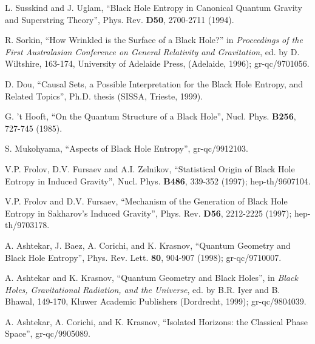 \documentclass[12pt]{article}
\newcommand{\comment}[1]{}
\newcommand{\keywords}[1]{}
\begin{document}
\begin{thebibliography}{999}
\comment{article} L. Susskind and J. Uglam, ``Black Hole
Entropy in Canonical Quantum Gravity and Superstring Theory'',
Phys. Rev. {\bf D50}, 2700-2711 (1994). \keywords{black hole
thermodynamics, quantum gravity}

\comment{inbook} R. Sorkin, ``How Wrinkled is the
Surface of a Black Hole?'' in {\it Proceedings of the First
Australasian Conference on General Relativity and Gravitation}, ed. by
D. Wiltshire, 163-174, University of Adelaide Press, (Adelaide, 1996);
gr-qc/9701056. \keywords{black hole thermodynamics, quantum gravity}

\comment{unpublished} D. Dou, ``Causal Sets, a Possible
Interpretation for the Black Hole Entropy, and Related Topics'',
Ph.D. thesis (SISSA, Trieste, 1999).

\comment{article} G. 't Hooft, ``On the Quantum Structure
of a Black Hole'', Nucl. Phys. {\bf B256}, 727-745 (1985).
\keywords{black hole thermodynamics, quantum gravity}

\comment{online} S. Mukohyama, ``Aspects of Black Hole
Entropy'', gr-qc/9912103. \keywords{black hole thermodynamics,
entropy}

\comment{article} V.P. Frolov, D.V. Fursaev and
A.I. Zelnikov, ``Statistical Origin of Black Hole Entropy in Induced
Gravity'', Nucl. Phys. {\bf B486}, 339-352 (1997); hep-th/9607104.
\keywords{black hole thermodynamics, entropy, quantum gravity}

\comment{article} V.P. Frolov and D.V. Fursaev,
``Mechanism of the Generation of Black Hole Entropy in Sakharov's
Induced Gravity'', Phys. Rev. {\bf D56}, 2212-2225 (1997);
hep-th/9703178.  \keywords{black hole thermodynamics, entropy, quantum
gravity}

\comment{article} A. Ashtekar, J. Baez, A. Corichi, and
K. Krasnov, ``Quantum Geometry and Black Hole Entropy'',
Phys. Rev. Lett. {\bf 80}, 904-907 (1998);
gr-qc/9710007. \keywords{black hole thermodynamics, entropy, quantum
gravity}

\comment{inbook} A. Ashtekar and K. Krasnov, ``Quantum
Geometry and Black Holes'', in {\it Black Holes, Gravitational
Radiation, and the Universe}, ed. by B.R. Iyer and B. Bhawal, 149-170,
Kluwer Academic Publishers (Dordrecht, 1999); gr-qc/9804039.
\keywords{black hole thermodynamics, entropy, quantum gravity}

\comment{online} A. Ashtekar, A. Corichi, and K. Krasnov,
``Isolated Horizons: the Classical Phase Space'', gr-qc/9905089.
\keywords{black hole thermodynamics, entropy, quantum gravity}


\end{thebibliography}
\end{document}
